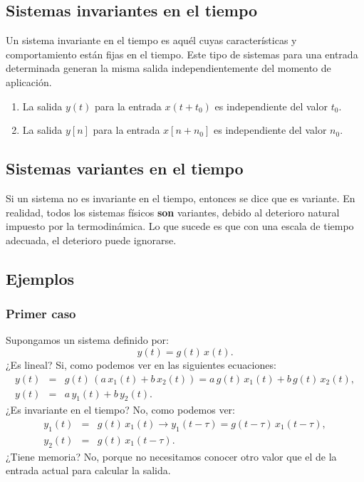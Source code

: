 \documentclass[11pt,a4paper,openany]{book}
\begin{document}
\subsection{Sistemas invariantes en el tiempo}
Un sistema invariante en el tiempo es aquél cuyas características y comportamiento están fijas en el tiempo. Este tipo de sistemas para una entrada determinada generan la misma salida independientemente del momento de aplicación.
\begin{enumerate}
	\item La salida $y(t)$ para la entrada $x(t+t_{0})$ es independiente del valor $t_{0}$.
	\item La salida $y[n]$ para la entrada $x[n + n_{0}]$ es independiente del valor $n_{0}$.
\end{enumerate}

\subsection{Sistemas variantes en el tiempo}
Si un sistema no es invariante en el tiempo, entonces se dice que es variante. En realidad, todos los sistemas físicos \textbf{son} variantes, debido al deterioro natural impuesto por la termodinámica. Lo que sucede es que con una escala de tiempo adecuada, el deterioro puede ignorarse.

\subsection{Ejemplos}

\subsubsection{Primer caso}
Supongamos un sistema definido por:
\begin{equation}
	y(t) = g(t) \, x(t).
\end{equation}
¿Es lineal? Si, como podemos ver en las siguientes ecuaciones:
\begin{eqnarray}
	y(t) &=& g(t) \, (a \, x_{1}(t) + b \, x_{2}(t)) = a \, g(t) \, x_{1}(t) + b \, g(t) \, x_{2}(t),    \\
	y(t) &=& a \, y_{1}(t) + b \, y_{2}(t).
\end{eqnarray}
¿Es invariante en el tiempo? No, como podemos ver:
\begin{eqnarray}
	y_{1}(t) &=& g(t) \, x_{1}(t) \rightarrow y_{1}(t-\tau) = g(t-\tau) \, x_{1}(t-\tau), \\
	y_{2}(t) &=& g(t) \, x_{1}(t-\tau).
\end{eqnarray}
¿Tiene memoria? No, porque no necesitamos conocer otro valor que el de la entrada actual para calcular la salida.
\end{document}
